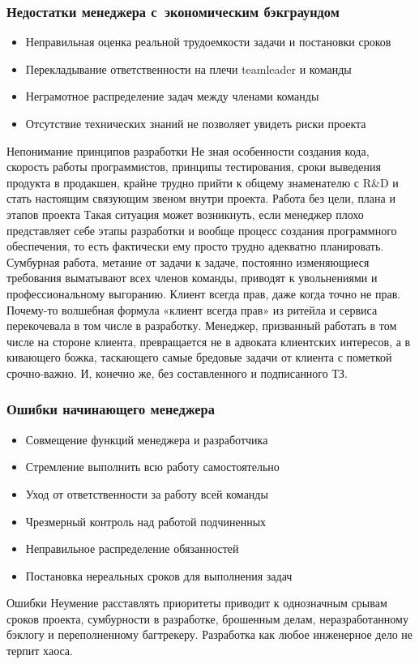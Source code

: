 \documentclass{../industrial-development}
\begin{document}
\begin{frame} \frametitle{Недостатки менеджера с~экономическим бэкграундом}
	 \begin{itemize}
                      \item Неправильная оценка реальной трудоемкости задачи и постановки сроков
		\item Перекладывание ответственности на плечи teamleader и команды
		\item Неграмотное распределение задач между членами команды
		\item Отсутствие технических знаний не позволяет увидеть риски проекта
	\end{itemize} 	
\end{frame}
\lecturenotes
Непонимание принципов разработки 
Не зная особенности создания кода, скорость работы программистов, принципы тестирования, сроки выведения продукта в продакшен, крайне трудно прийти к общему знаменателю с R&D и стать настоящим связующим звеном внутри проекта.
Работа без цели, плана и этапов проекта 
Такая ситуация может возникнуть, если менеджер плохо представляет себе этапы разработки и вообще процесс создания программного обеспечения, то есть фактически ему просто трудно адекватно планировать. Сумбурная работа, метание от задачи к задаче, постоянно изменяющиеся требования выматывают всех членов команды, приводят к увольнениями и профессиональному выгоранию.
Клиент всегда прав, даже когда точно не прав. 
Почему-то волшебная формула «клиент всегда прав» из ритейла и сервиса перекочевала в том числе в разработку. Менеджер, призванный работать в том числе на стороне клиента, превращается не в адвоката клиентских интересов, а в кивающего божка, таскающего самые бредовые задачи от клиента с пометкой срочно-важно. И, конечно же, без составленного и подписанного ТЗ.




\begin{frame} \frametitle{Ошибки начинающего менеджера}
\begin{itemize}	
		\item Совмещение функций менеджера и разработчика	
		\item Стремление выполнить всю работу самостоятельно
	 	\item Уход от ответственности за работу всей команды
		\item Чрезмерный контроль над работой подчиненных
	 	\item Неправильное распределение обязанностей
	 	\item Постановка нереальных сроков для выполнения задач
 \end{itemize}
\end{frame}
\lecturenotes
Ошибки
Неумение расставлять приоритеты приводит к однозначным срывам сроков проекта, сумбурности в разработке, брошенным делам, неразработанному бэклогу и переполненному багтрекеру. Разработка как любое инженерное дело не терпит хаоса. 
\end{document}
